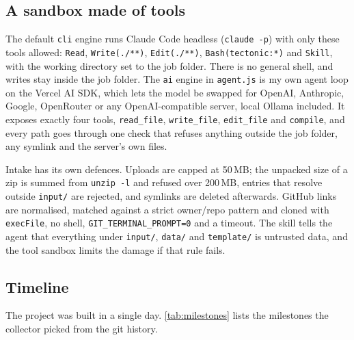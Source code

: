 \documentclass[11pt]{article}
\begin{document}
\subsection{A sandbox made of tools}

The default \texttt{cli} engine runs Claude Code headless (\texttt{claude -p}) with only these tools allowed: \texttt{Read}, \texttt{Write(./**)}, \texttt{Edit(./**)}, \texttt{Bash(tectonic:*)} and \texttt{Skill}, with the working directory set to the job folder. There is no general shell, and writes stay inside the job folder. The \texttt{ai} engine in \texttt{agent.js} is my own agent loop on the Vercel AI SDK, which lets the model be swapped for OpenAI, Anthropic, Google, OpenRouter or any OpenAI-compatible server, local Ollama included. It exposes exactly four tools, \texttt{read\_file}, \texttt{write\_file}, \texttt{edit\_file} and \texttt{compile}, and every path goes through one check that refuses anything outside the job folder, any symlink and the server's own files.

Intake has its own defences. Uploads are capped at 50\,MB; the unpacked size of a zip is summed from \texttt{unzip -l} and refused over 200\,MB, entries that resolve outside \texttt{input/} are rejected, and symlinks are deleted afterwards. GitHub links are normalised, matched against a strict owner/repo pattern and cloned with \texttt{execFile}, no shell, \texttt{GIT\_TERMINAL\_PROMPT=0} and a timeout. The skill tells the agent that everything under \texttt{input/}, \texttt{data/} and \texttt{template/} is untrusted data, and the tool sandbox limits the damage if that rule fails.

\subsection{Timeline}

The project was built in a single day. \autoref{tab:milestones} lists the milestones the collector picked from the git history.
\end{document}
